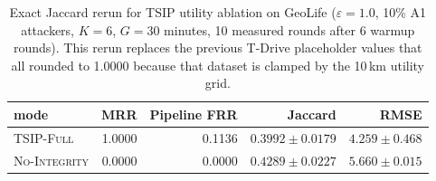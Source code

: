 \begin{table}[t]
\centering
\caption{Exact Jaccard rerun for TSIP utility ablation on GeoLife
(\(\varepsilon{=}1.0\), 10\% A1 attackers, \(K{=}6\), \(G{=}30\) minutes,
10 measured rounds after 6 warmup rounds). This rerun replaces the previous
T-Drive placeholder values that all rounded to 1.0000 because that dataset is
clamped by the 10\,km utility grid.}
\label{tab:exact-jaccard-ablation}
\scriptsize
\setlength{\tabcolsep}{3pt}
\begin{tabularx}{\columnwidth}{@{}Y r r r r@{}}
\toprule
mode & MRR & Pipeline FRR & Jaccard & RMSE \\
\midrule
\textsc{TSIP-Full} & 1.0000 & 0.1136 & $0.3992 \pm 0.0179$ & $4.259 \pm 0.468$ \\
\textsc{No-Integrity} & 0.0000 & 0.0000 & $0.4289 \pm 0.0227$ & $5.660 \pm 0.015$ \\
\bottomrule
\end{tabularx}
\end{table}
